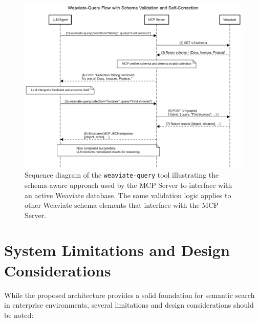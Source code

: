 \begin{figure}
    \centering
    \includegraphics[width=1\linewidth]{Images/Sequence-diagram-Weaviate-Query.png}
    \caption{Sequence diagram of the \texttt{weaviate-query} tool illustrating the schema-aware approach used by the MCP Server to interface with an active Weaviate database. The same validation logic applies to other Weaviate schema elements that interface with the MCP Server.}\label{fig:sequence-diagram-weaviate-query}
\end{figure}

\section{System Limitations and Design Considerations}\label{sec:system-limitations}

While the proposed architecture provides a solid foundation for semantic search in enterprise environments, several limitations and design considerations should be noted:

